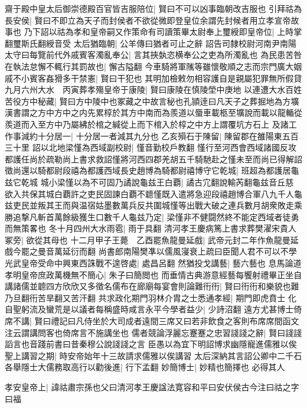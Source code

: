 齋于殿中皇太后御崇德殿百官皆吉服陪位|{
	賢曰不可以凶事臨朝改吉服也}
引拜祜為長安侯|{
	賢曰不即立為天子而封侯者不欲從微即登皇位余謂先封候者用立孝宣帝故事也}
乃下詔以祜為孝和皇帝嗣又作策命有司讀策畢太尉奉上璽綬即皇帝位|{
	上時掌翻璽斯氏翻綬音受}
太后猶臨朝|{
	公羊傳曰猶者可止之辭}
詔告司隸校尉河南尹南陽太守曰每覽前代外戚賓客濁亂奉公|{
	言其挾埶恣横奉公之吏為所濁亂也}
為民患苦咎在執法怠懈不輒行其罰故也|{
	懈古隘翻}
今車騎將軍隲等雖懷敬順之志而宗門廣大姻戚不小賓客姦猾多干禁憲|{
	賢曰干犯也}
其明加檢敕勿相容護自是親屬犯罪無所假貸　九月六州大水　丙寅葬孝殤皇帝于康陵|{
	賢曰康陵在慎陵塋中庚地}
以連遭大水百姓苦役方中秘藏|{
	賢曰方中陵中也冢藏之中故言秘也孔頴逹曰凡天子之葬掘地為方壙漢書謂之方中方中之内先累椁於其方中南而為羨道以蜃車載柩至壙說而載以龍輴從羨道而入至方中乃屬紼於棺之緘從上而下棺入於椁之中方上謂覆坑方石上}
及諸工作事減約十分居一|{
	十分居一者減其九分也}
乙亥殞石于陳留|{
	陳留郡在雒陽東五百三十里}
詔以北地梁慬為西域副校尉|{
	慬音勤校戶教翻}
慬行至河西會西域諸國反攻都護任尚於疏勒尚上書求救詔慬將河西四郡羌胡五千騎馳赴之慬未至而尚已得解詔徵尚還以騎都尉段禧為都護西域長史趙博為騎都尉禧博守它乾城|{
	班超為都護居龜兹它乾城}
城小梁慬以為不可固乃譎說龜兹王白覇|{
	譎古宂翻說輸芮翻龜兹音丘慈}
欲入共保其城白覇許之吏民固諫白覇不聼慬既入遣將急迎段禧趙博合軍八九千人龜兹吏民並叛其王而與温宿姑墨數萬兵反共圍城慬等出戰大破之連兵數月胡衆敗走乘勝追撃凡斬首萬餘級獲生口數千人龜兹乃定|{
	梁慬非不健闘然終不能定西域者徒勇而無策畧也}
冬十月四州大水雨雹|{
	雨于具翻}
清河孝王慶病篤上書求葬樊濯宋貴人冢旁|{
	欲從其母也}
十二月甲子王薨　乙酉罷魚龍曼延戲|{
	武帝元封二年作魚龍曼延戲今罷之曼音萬延衍而翻}
尚書郎南陽樊凖以儒風寖衰上疏曰臣聞人君不可以不學光武皇帝受命中興東西誅戰不遑啓處|{
	處昌呂翻}
然猶投戈講藝|{
	藝六藝也}
息馬論道孝明皇帝庶政萬機無不簡心|{
	朱子曰簡閲也}
而垂情古典游意經藝每饗射禮畢正坐自講諸儒並聼四方欣欣又多徵名儒布在廊廟每宴會則論難衎衎|{
	賢曰衎衎和樂貌也難乃旦翻衎苦旱翻又苦汗翻}
共求政化期門羽林介胄之士悉通孝經|{
	期門即虎賁士}
化自聖躬流及蠻荒是以議者每稱盛時咸言永平今學者益少|{
	少詩沼翻}
遠方尤甚博士倚席不講|{
	賢曰禮記曰凡侍坐於大司成者遠間三席又曰若非飲食之客則布席席間函文注云謂講問客也倚席言不施講坐也}
儒者競論浮麗忘蹇蹇之忠習諓諓之辭|{
	賢曰諓諓謟言也音踐前書曰昔秦穆公說諓諓之言}
臣愚以為宜下明詔博求幽隱寵進儒雅以俟聖上講習之期|{
	時安帝始年十三故請求儒雅以俟講習}
太后深納其言詔公卿中二千石各舉隱士大儒務取高行以勸後進|{
	行下孟翻}
妙簡博士|{
	妙精也簡擇也}
必得其人

孝安皇帝上|{
	諱祜肅宗孫也父曰清河孝王慶諡法寛容和平曰安伏侯古今注曰祜之字曰福}


